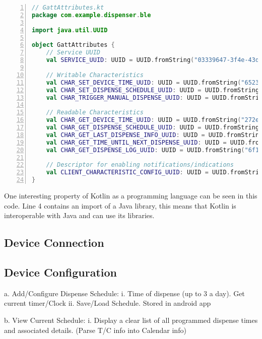 \begin{lstlisting}[style=kotlinstyle,caption={\ac{GATT} attributes defined in a separate file},label={lst:GATTs},float=htbp,language=Kotlin,numbers=left]
// GattAttributes.kt
package com.example.dispenser.ble

import java.util.UUID

object GattAttributes {
	// Service UUID
	val SERVICE_UUID: UUID = UUID.fromString("03339647-3f4e-43df-abff-fac54287cf1a")
	
	// Writable Characteristics
	val CHAR_SET_DEVICE_TIME_UUID: UUID = UUID.fromString("65232f1d-618a-4268-9050-0548142a4536")
	val CHAR_SET_DISPENSE_SCHEDULE_UUID: UUID = UUID.fromString("999c584e-06c0-49a1-995a-66b7c802ac1b")
	val CHAR_TRIGGER_MANUAL_DISPENSE_UUID: UUID = UUID.fromString("36bb95f2-e57e-4db9-b9aa-fb6541ee784e")
	
	// Readable Characteristics
	val CHAR_GET_DEVICE_TIME_UUID: UUID = UUID.fromString("272ee276-e37e-4d78-8c5e-bb7225d35074")
	val CHAR_GET_DISPENSE_SCHEDULE_UUID: UUID = UUID.fromString("b53c2ed4-ae26-476d-8414-011a025dddfc")
	val CHAR_GET_LAST_DISPENSE_INFO_UUID: UUID = UUID.fromString("40d3b5d8-5480-4b7b-a115-5fe86bf17d7d")
	val CHAR_GET_TIME_UNTIL_NEXT_DISPENSE_UUID: UUID = UUID.fromString("4b14acc4-768a-43e1-9d6c-0d97307e2666")
	val CHAR_GET_DISPENSE_LOG_UUID: UUID = UUID.fromString("6f182da7-c5a8-40ab-a637-f97ed6b5777b")
	
	// Descriptor for enabling notifications/indications
	val CLIENT_CHARACTERISTIC_CONFIG_UUID: UUID = UUID.fromString("00002902-0000-1000-8000-00805f9b34fb")
}
\end{lstlisting}
One interesting property of Kotlin as a programming language can be seen in this code. Line 4 contains an import of a Java library, this means that Kotlin is interoperable with Java and can use its libraries.
\subsection{Device Connection}

\subsection{Device Configuration}
  a. Add/Configure Dispense Schedule:
  i. Time of dispense (up to 3 a day). Get current timer/Clock
  ii. Save/Load Schedule. Stored in android app
  
  b. View Current Schedule:
  i. Display a clear list of all programmed dispense times and associated details. (Parse T/C info into Calendar info)
  
